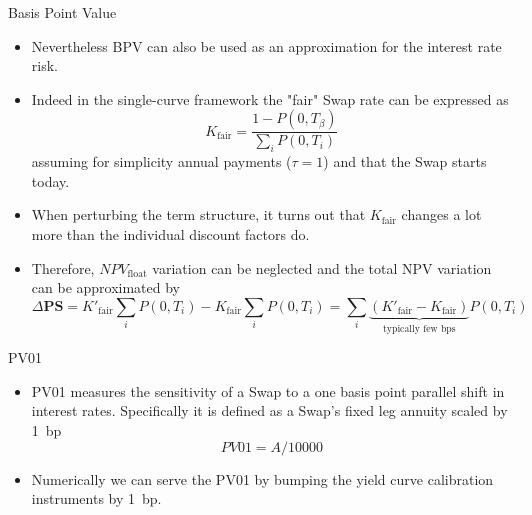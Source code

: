 \documentclass{beamer}
\begin{document}
\begin{frame}{Basis Point Value}
\begin{itemize}
	\item<1-> Nevertheless BPV can also be used as an approximation for the interest rate risk.
	\item<1-> Indeed in the single-curve framework the "fair" Swap rate can be expressed as 
	\begin{equation*}
		K_{\text{fair}}=\frac{1-P(0, T_\beta)}{\sum_i P(0, T_i)}
	\end{equation*} 
	assuming for simplicity annual payments ($\tau = 1$) and that the Swap starts today.
	\item<2-> When perturbing the term structure, it turns out that $K_{\text{fair}}$ changes a lot more than the individual discount factors do. 
	\item<3-> Therefore, $NPV_{\text{float}}$ variation can be neglected and the total NPV variation can be approximated by
	\begin{equation*}
	\Delta\textbf{PS} = K'_{\text{fair}}\sum_i P(0, T_i) - K_{\text{fair}}\sum_i P(0, T_i) = \sum_i \underbrace{(K'_{\text{fair}} - K_{\text{fair}})}_{\text{typically few bps}}P(0, T_i) \end{equation*}
\end{itemize}
\end{frame}

\begin{frame}{PV01}
\begin{itemize}
\item PV01 measures the sensitivity of a Swap to a one basis point parallel shift in interest rates. Specifically it is defined as a Swap's fixed leg annuity scaled by 1~bp
\begin{equation}
PV01 = A/10000
\end{equation}
\item Numerically we can serve the PV01 by bumping the yield curve calibration instruments by 1~bp. 
\end{itemize}
\end{frame}
\end{document}
